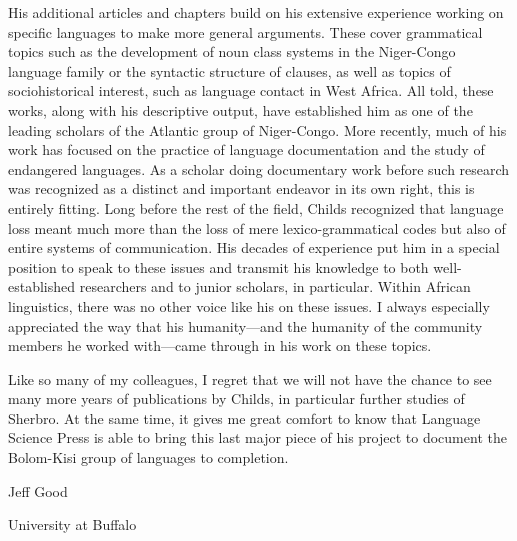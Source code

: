 His additional articles and chapters build on his extensive experience working on specific languages to make more general arguments. These cover grammatical topics such as the development of noun class systems in the Niger-Congo language family or the syntactic structure of clauses, as well as topics of sociohistorical interest, such as language contact in West Africa. All told, these works, along with his descriptive output, have established him as one of the leading scholars of the Atlantic group of Niger-Congo. More recently, much of his work has focused on the practice of language documentation and the study of endangered languages. As a scholar doing documentary work before such research was recognized as a distinct and important endeavor in its own right, this is entirely fitting. Long before the rest of the field, Childs recognized that language loss meant much more than the loss of mere lexico-grammatical codes but also of entire systems of communication. His decades of experience put him in a special position to speak to these issues and transmit his knowledge to both well-established researchers and to junior scholars, in particular. Within African linguistics, there was no other voice like his on these issues. I always especially appreciated the way that his humanity—and the humanity of the community members he worked with—came through in his work on these topics.

Like so many of my colleagues, I regret that we will not have the chance to see many more years of publications by Childs, in particular further studies of Sherbro. At the same time, it gives me great comfort to know that Language Science Press is able to bring this last major piece of his project to document the Bolom-Kisi group of languages to completion.

\hfill Jeff Good

\hfill University at Buffalo
 
 
